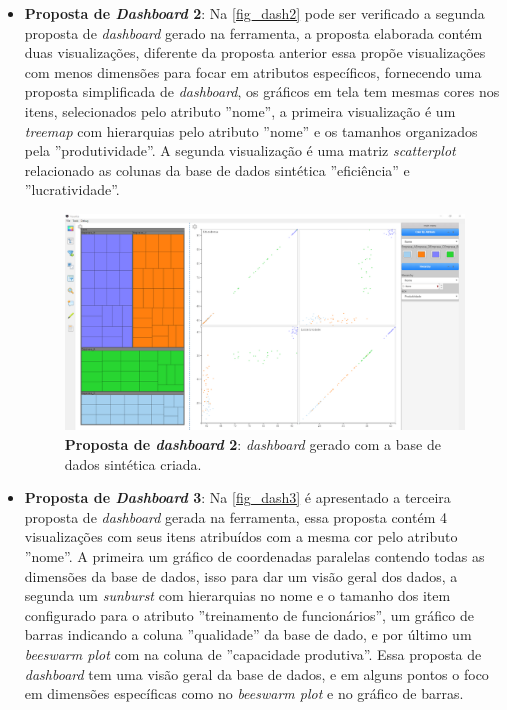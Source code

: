 \documentclass[
	12pt,				%
	openright,			%
	oneside,			%
	a4paper,			%
	english,			%
	brazil				%
	]{abntex2}
\begin{document}
\begin{itemize}
    \item \textbf{Proposta de  \textit{Dashboard} 2}:
     Na \autoref{fig_dash2} pode ser verificado a segunda proposta de \textit{dashboard} gerado na ferramenta, a proposta elaborada contém duas visualizações, diferente da proposta anterior essa propõe visualizações com menos dimensões para focar em atributos específicos, fornecendo uma proposta simplificada de \textit{dashboard}, os gráficos em tela tem mesmas cores nos itens, selecionados pelo atributo ''nome'', a primeira visualização é um \textit{treemap} com hierarquias pelo atributo ''nome'' e os tamanhos organizados pela ''produtividade''. A segunda visualização é uma matriz \textit{scatterplot} relacionado as colunas da base de dados sintética ''eficiência'' e ''lucratividade''.
    
    \begin{figure}[h]
	    \caption{\label{fig_dash2} \textbf{Proposta de \textit{dashboard} 2}: \textit{dashboard} gerado com a base de dados sintética criada.
        }
	\begin{center}
	    \includegraphics[width=\textwidth]{figures/dash2.png}
	\end{center}
    \end{figure}

    \item \textbf{Proposta de \textit{Dashboard} 3}: Na \autoref{fig_dash3} é apresentado a terceira proposta de \textit{dashboard} gerada na ferramenta, essa proposta contém 4 visualizações com seus itens atribuídos com a mesma cor pelo atributo ''nome''. A primeira um gráfico de coordenadas paralelas contendo todas as dimensões da base de dados, isso para dar um visão geral dos dados, a segunda um \textit{sunburst} com hierarquias no nome e o tamanho dos item configurado para o atributo ''treinamento de funcionários'', um gráfico de barras indicando a coluna ''qualidade'' da base de dado, e por último um \textit{beeswarm plot} com na coluna de ''capacidade produtiva''. Essa proposta de \textit{dashboard} tem uma visão geral da base de dados, e em alguns pontos o foco em dimensões específicas como no \textit{beeswarm plot} e no gráfico de barras.
    

\end{itemize}
\end{document}
